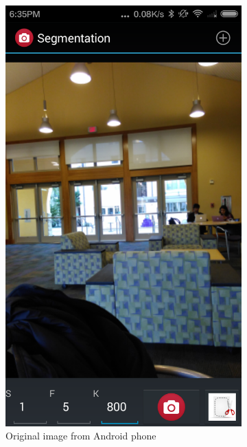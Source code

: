 \documentclass[12pt, english, titlepage]{article}
\begin{document}
\begin{figure}
        \centering
        \begin{subfigure}[b]{0.3\textwidth}
                \includegraphics[width=\textwidth]{./img/screensh.png}
                \caption{Original image from Android phone}
                \label{og}
        \end{subfigure}
        \begin{subfigure}[b]{0.3\textwidth}

\end{subfigure}
\end{figure}
\end{document}
